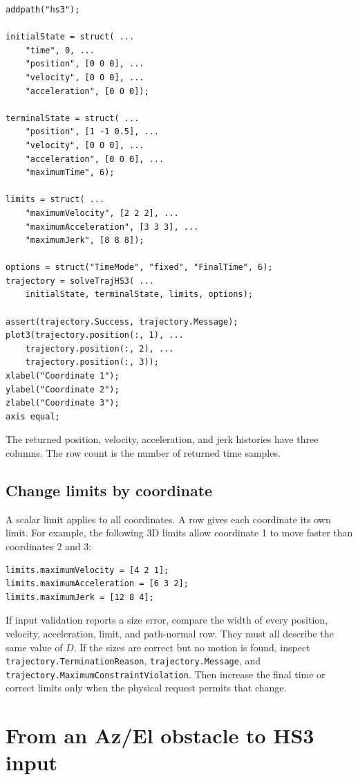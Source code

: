 \documentclass[10pt,letterpaper]{article}
\newcommand{\file}[1]{\nolinkurl{#1}}
\begin{document}
\begin{lstlisting}
addpath("hs3");

initialState = struct( ...
    "time", 0, ...
    "position", [0 0 0], ...
    "velocity", [0 0 0], ...
    "acceleration", [0 0 0]);

terminalState = struct( ...
    "position", [1 -1 0.5], ...
    "velocity", [0 0 0], ...
    "acceleration", [0 0 0], ...
    "maximumTime", 6);

limits = struct( ...
    "maximumVelocity", [2 2 2], ...
    "maximumAcceleration", [3 3 3], ...
    "maximumJerk", [8 8 8]);

options = struct("TimeMode", "fixed", "FinalTime", 6);
trajectory = solveTrajHS3( ...
    initialState, terminalState, limits, options);

assert(trajectory.Success, trajectory.Message);
plot3(trajectory.position(:, 1), ...
    trajectory.position(:, 2), ...
    trajectory.position(:, 3));
xlabel("Coordinate 1");
ylabel("Coordinate 2");
zlabel("Coordinate 3");
axis equal;
\end{lstlisting}

The returned position, velocity, acceleration, and jerk histories have three
columns. The row count is the number of returned time samples.

\subsection{Change limits by coordinate}

A scalar limit applies to all coordinates. A row gives each coordinate its own
limit. For example, the following 3D limits allow coordinate 1 to move faster
than coordinates 2 and 3:

\begin{lstlisting}
limits.maximumVelocity = [4 2 1];
limits.maximumAcceleration = [6 3 2];
limits.maximumJerk = [12 8 4];
\end{lstlisting}

If input validation reports a size error, compare the width of every position,
velocity, acceleration, limit, and path-normal row. They must all describe the
same value of $D$. If the sizes are correct but no motion is found, inspect
\file{trajectory.TerminationReason}, \file{trajectory.Message}, and
\file{trajectory.MaximumConstraintViolation}. Then increase the final time or
correct limits only when the physical request permits that change.

\section{From an Az/El obstacle to HS3 input}\label{sec:obstacles}
\end{document}
